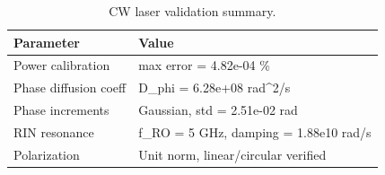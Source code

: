 \begin{table}[!ht]
  \caption{CW laser validation summary.}
  \label{tab:cwlaser}
  \centering
  \begin{tabular}{l l}
    \toprule
    Parameter & Value \\
    \midrule
    Power calibration & max error = 4.82e-04 \% \\
    Phase diffusion coeff & D\_phi = 6.28e+08 rad\textasciicircum{}2/s \\
    Phase increments & Gaussian, std = 2.51e-02 rad \\
    RIN resonance & f\_RO = 5 GHz, damping = 1.88e10 rad/s \\
    Polarization & Unit norm, linear/circular verified \\
    \bottomrule
  \end{tabular}
\end{table}
